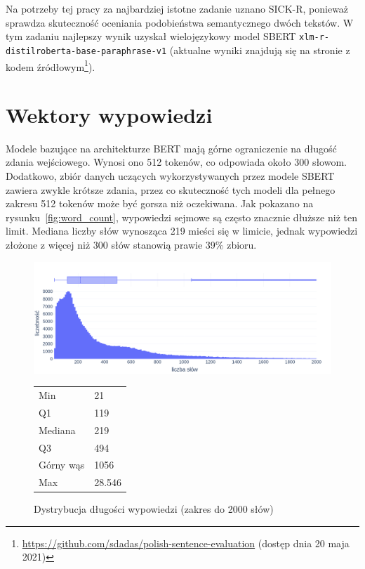 	Na potrzeby tej pracy za najbardziej istotne zadanie uznano SICK-R, ponieważ sprawdza skuteczność oceniania podobieństwa semantycznego dwóch tekstów.
	W tym zadaniu najlepszy wynik uzyskał wielojęzykowy model SBERT \verb|xlm-r-distilroberta-base-paraphrase-v1|
		(aktualne wyniki znajdują się na stronie z kodem źródłowym\footnote{\url{https://github.com/sdadas/polish-sentence-evaluation} (dostęp dnia 20 maja 2021)}).

\section{Wektory wypowiedzi}\label{sec:sentences}
	Modele bazujące na architekturze BERT mają górne ograniczenie na długość zdania wejściowego.
	Wynosi ono 512 tokenów, co odpowiada około 300 słowom.
	Dodatkowo, zbiór danych uczących wykorzystywanych przez modele SBERT zawiera zwykle krótsze zdania,
		przez co skuteczność tych modeli dla pełnego zakresu 512 tokenów może być gorsza niż oczekiwana.
	Jak pokazano na rysunku~\ref{fig:word_count}, wypowiedzi sejmowe są często znacznie dłuższe niż ten limit.
	Mediana liczby słów wynosząca 219 mieści się w limicie, jednak wypowiedzi złożone z więcej niż 300 słów stanowią prawie 39\% zbioru.
  \begin{figure}[ht]
    \begin{minipage}{.75\textwidth}\label{fig:word_count}
      \includegraphics[width=\textwidth]{rys03/word_count.png}
    \end{minipage}%
    \begin{minipage}{.25\textwidth}\label{tab:word_count}
      \small
      \begin{tabularx}{\textwidth}{ll}
        Min & 21 \\ 
        Q1 & 119 \\ 
        Mediana & 219 \\
        Q3 & 494 \\ 
        Górny wąs & 1056 \\
        Max & 28.546 \\
      \end{tabularx}
    \end{minipage}
    \caption{Dystrybucja długości wypowiedzi (zakres do 2000 słów)}
  \end{figure}


